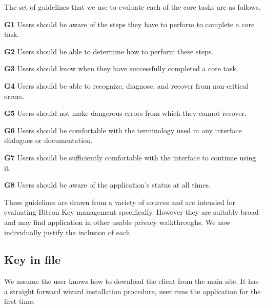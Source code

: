 The set of guidelines that we use to evaluate each of the core tasks are as follows.
	
\begin{compactlist}
	\item[\bf G1] Users should be aware of the steps they have to perform to complete a core task.
	\item[\bf G2] Users should be able to determine how to perform these steps.
	\item[\bf G3] Users should know when they have successfully completed a core task.
	\item[\bf G4] Users should be able to recognize, diagnose, and recover from non-critical errors.
	\item[\bf G5] Users should not make dangerous errors from which they cannot recover.
	\item[\bf G6] Users should be comfortable with the terminology used in any interface dialogues or documentation.
	\item[\bf G7] Users should be sufficiently comfortable with the interface to continue using it.
	\item[\bf G8] Users should be aware of the application's status at all times.
\end{compactlist}

These guidelines are drawn from a variety of sources \cite{cw,johnny,karat,p3p,pvo,clark} and are intended for evaluating Bitcon Key management specifically. However they are suitably broad and may find application in other usable privacy walkthroughs. We now individually justify the inclusion of each.


\subsection{Key in file}
We assume the user knows how to download the client from the main site. It has a straight forward wizard installation procedure, user runs the application for the first time. 

